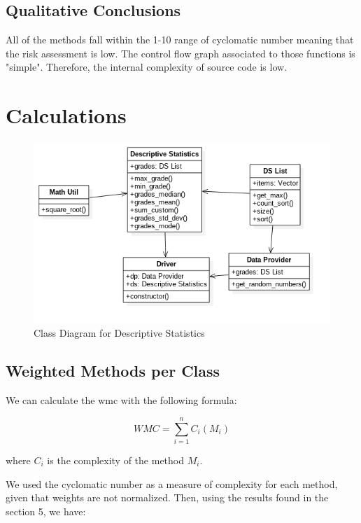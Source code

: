 \documentclass[11pt]{article}
\begin{document}
\newpage

\subsection{Qualitative Conclusions}

All of the methods fall within the 1-10 range of cyclomatic number meaning that the risk assessment is low. The control flow graph associated to those functions is "simple". Therefore, the internal complexity of source code is low.

\newpage

\section{Calculations}

\begin{figure}[h!]
	\centering
		\includegraphics[width=\textwidth]{classdiagram.png}
	\caption{Class Diagram for Descriptive Statistics}
	\label{fig:classdiagram}
\end{figure}

\newpage

\subsection{Weighted Methods per Class}

We can calculate the \gls{wmc} with the following formula:

$$ WMC = \sum\limits_{i=1}^{n} C_{i}(M_{i}) $$ 

where $ C_{i} $ is the complexity of the method $ M_{i} $.\newline

We used the cyclomatic number as a measure of complexity for each method, given that weights are not normalized. Then, using the results found in the section 5, we have:
\end{document}

